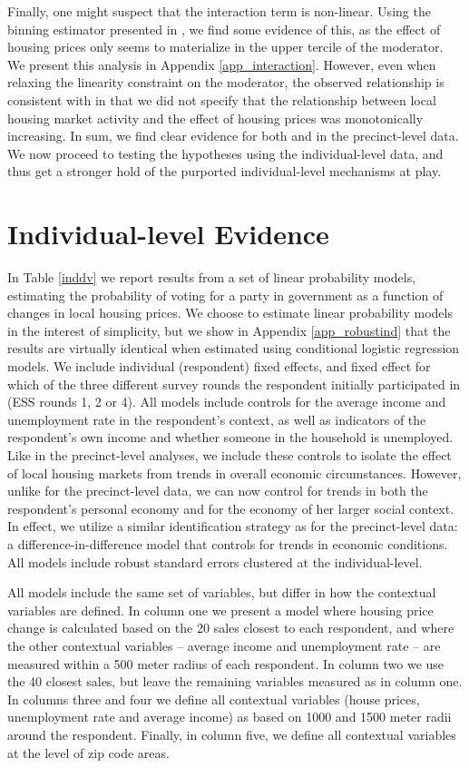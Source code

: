 \documentclass[12pt,a4paper]{article}
\begin{document}
	Finally, one might suspect that the interaction term is non-linear. Using the binning estimator presented in \cite{hainmueller2016much}, we find some evidence of this, as the effect of housing prices only seems to materialize in the upper tercile of the moderator. We present this analysis in Appendix \ref{app_interaction}. However, even when relaxing the linearity constraint on the moderator, the observed relationship is consistent with \htwo in that we did not specify that the relationship between local housing market activity and the effect of housing prices was monotonically increasing. 
	In sum, we find clear evidence for both \hone and \htwo in the precinct-level data. We now proceed to testing the hypotheses using the individual-level data, and thus get a stronger hold of the purported individual-level mechanisms at play.
	
	\section{Individual-level Evidence}
	
	In Table \ref{inddv} we report results from a set of linear probability models, estimating the probability of voting for a party in government as a function of changes in local housing prices. We choose to estimate linear probability models in the interest of simplicity, but we show in Appendix \ref{app_robustind} that the results are virtually identical when estimated using conditional logistic regression models. We include individual (respondent) fixed effects, and fixed effect for which of the three different survey rounds the respondent initially participated in (ESS rounds 1, 2 or 4). All models include controls for the average income and unemployment rate in the respondent's context, as well as indicators of the respondent's own income and whether someone in the household is unemployed. Like in the precinct-level analyses, we include these controls to isolate the effect of local housing markets from trends in overall economic circumstances. However, unlike for the precinct-level data, we can now control for trends in both the respondent’s personal economy and for the economy of her larger social context. In effect, we utilize a similar identification strategy as for the precinct-level data: a difference-in-difference model that controls for trends in economic conditions. All models include robust standard errors clustered at the individual-level.
	
	All models include the same set of variables, but differ in how the contextual variables are defined. In column one we present a model where housing price change is calculated based on the 20 sales closest to each respondent, and where the other contextual variables -- average income and unemployment rate -- are measured within a 500 meter radius of each respondent. In column two we use the 40 closest sales, but leave the remaining variables measured as in column one. In columns three and four we define all contextual variables (house prices, unemployment rate and average income) as based on 1000 and 1500 meter radii around the respondent. Finally, in column five, we define all contextual variables at the level of zip code areas. 
	
\end{document}
